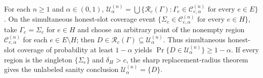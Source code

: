 For each \(n\ge1\) and \(\alpha\in(0,1)\), \(\mathcal U^{(n)}_{\alpha}=\bigcup\{\mathcal R_c(\Gamma):\Gamma_e\in\mathcal C^{(n)}_{e,\alpha}\text{ for every }e\in E\}\). On the simultaneous honest-slot coverage event \(\{\Sigma_e\in\mathcal C^{(n)}_{e,\alpha}\text{ for every }e\in H\}\), take \(\Gamma_e=\Sigma_e\) for \(e\in H\) and choose an arbitrary point of the nonempty region \(\mathcal C^{(n)}_{e,\alpha}\) for each \(e\in E\setminus H\); then \(D\in\mathcal R_c(\Gamma)\subseteq\mathcal U^{(n)}_{\alpha}\). Thus simultaneous honest-slot coverage of probability at least \(1-\alpha\) yields \(\Pr\{D\in\mathcal U^{(n)}_{\alpha}\}\ge1-\alpha\). If every region is the singleton \(\{\Sigma_e\}\) and \(\delta_H>c\), the sharp replacement-radius theorem gives the unlabeled sanity conclusion \(\mathcal U^{(n)}_{\alpha}=\{D\}\).